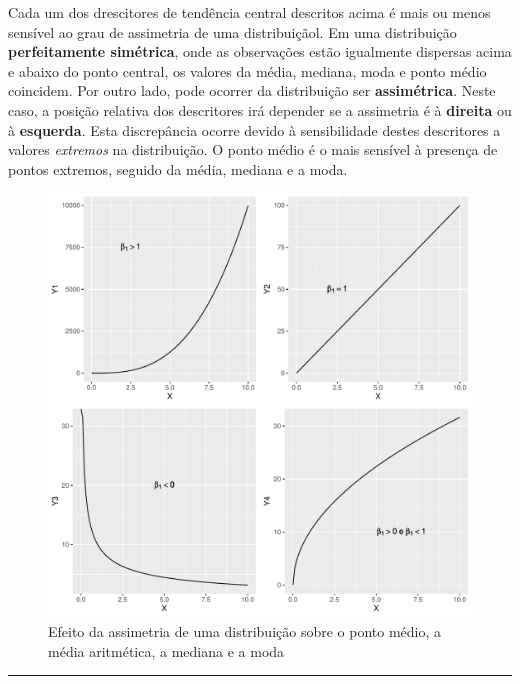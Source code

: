 \documentclass[
]{book}
\begin{document}
Cada um dos drescitores de tendência central descritos acima é mais ou menos sensível ao grau de assimetria de uma distribuiçãol. Em uma distribuição \textbf{perfeitamente simétrica}, onde as observações estão igualmente dispersas acima e abaixo do ponto central, os valores da média, mediana, moda e ponto médio coincidem. Por outro lado, pode ocorrer da distribuição ser \textbf{assimétrica}. Neste caso, a posição relativa dos descritores irá depender se a assimetria é à \textbf{direita} ou à \textbf{esquerda}. Esta discrepância ocorre devido à sensibilidade destes descritores a valores \emph{extremos} na distribuição. O ponto médio é o mais sensível à presença de pontos extremos, seguido da média, mediana e a moda.

\begin{figure}

{\centering \includegraphics{probest-cambientais_files/figure-latex/unnamed-chunk-120-1} 

}

\caption{Efeito da assimetria de uma distribuição sobre o ponto médio, a média aritmética, a mediana e a moda}\label{fig:unnamed-chunk-120}
\end{figure}

\begin{center}\rule{0.5\linewidth}{0.5pt}\end{center}
\end{document}

